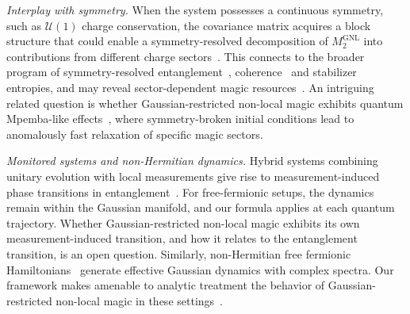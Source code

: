 \documentclass[aps,prl,twocolumn,superscriptaddress,reprint,longbibliography,nofootinbib]{revtex4-2}
\providecommand{\DIFdelbegin}{} %
\providecommand{\DIFdelend}{} %
\newcommand{\DIFscaledelfig}{0.5}
\newlength{\DIFdelgraphicswidth} %
\newlength{\DIFdelgraphicsheight} %
\newcommand{\DIFdelincludegraphics}[2][]{%
\sbox{\DIFdelgraphicsbox}{\DIFOincludegraphics[#1]{#2}}%
\settoboxwidth{\DIFdelgraphicswidth}{\DIFdelgraphicsbox} %
\settoboxtotalheight{\DIFdelgraphicsheight}{\DIFdelgraphicsbox} %
\scalebox{\DIFscaledelfig}{%
\parbox[b]{\DIFdelgraphicswidth}{\usebox{\DIFdelgraphicsbox}\\[-\baselineskip] \rule{\DIFdelgraphicswidth}{0em}}\llap{\resizebox{\DIFdelgraphicswidth}{\DIFdelgraphicsheight}{%
\setlength{\unitlength}{\DIFdelgraphicswidth}%
\begin{picture}(1,1)%
\thicklines\linethickness{2pt} %
{\color[rgb]{1,0,0}\put(0,0){\framebox(1,1){}}}%
{\color[rgb]{1,0,0}\put(0,0){\line( 1,1){1}}}%
{\color[rgb]{1,0,0}\put(0,1){\line(1,-1){1}}}%
\end{picture}%
}\hspace*{3pt}}} %
} %
\DeclareRobustCommand{\DIFdelbegin}{\DIFOdelbegin \let\includegraphics\DIFdelincludegraphics} %
\DeclareRobustCommand{\DIFdelend}{\DIFOaddend \let\includegraphics\DIFOincludegraphics} %
\begin{document}
\emph{Interplay with symmetry.}
When the system possesses a continuous symmetry, such as $\mathcal{U}(1)$ charge conservation, the covariance matrix acquires a block structure that could enable a symmetry-resolved decomposition of $M_2^{\mathrm{GNL}}$ into contributions from different charge sectors~\cite{Goldstein}.
This connects to the broader program of symmetry-resolved entanglement~\cite{Bianchi_2022}, coherence~\cite{aditya2026coherencedynamicsquantummanybody} and stabilizer entropies, and may reveal sector-dependent magic resources~\cite{iannotti2026nonstabilizernessu1symmetrychaotic, cepollaro2025stabilizerentropysubspaces, Esposito_2024}.
An intriguing related question is whether Gaussian-restricted non-local magic exhibits quantum Mpemba-like effects~\cite{Ares_2023,Ares_2025,aditya2025mpembaeffectsquantumcomplexity}, where symmetry-broken initial conditions lead to anomalously fast relaxation of specific magic sectors.

\emph{Monitored systems and non-Hermitian dynamics.}
Hybrid systems combining unitary evolution with local measurements give rise to measurement-induced phase transitions in entanglement~\cite{FisherRandom2023,Li_2025,oshima}.
For free-fermionic setups, the dynamics remain within the Gaussian manifold, and our formula applies at each quantum trajectory.
Whether Gaussian-restricted non-local magic exhibits its own measurement-induced transition, and how it relates to the entanglement transition, is an open question.
Similarly, non-Hermitian free fermionic Hamiltonians~\cite{Ashida_2020,kawabata2026nonhermitiandisorderedsystems} generate effective Gaussian dynamics with complex spectra.
Our framework makes amenable to analytic treatment the behavior of Gaussian-restricted non-local magic in these settings~\cite{schirooooo,gallo,granet,lapierre2025entanglementtransitionsstructuredrandom}.
\DIFdelbegin %

\DIFdelend 
\end{document}
